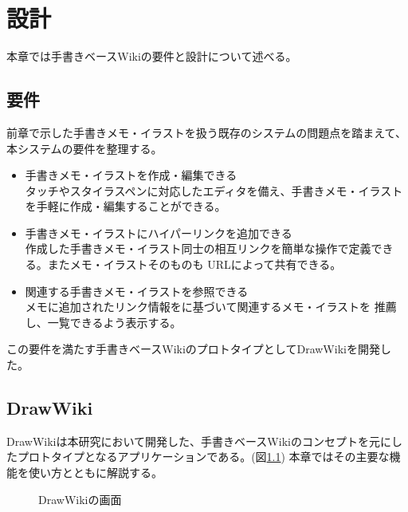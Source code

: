 \chapter{設計}
\label{chap:sekkei}

本章では手書きベースWikiの要件と設計について述べる。

\newpage

\section{要件}
前章で示した手書きメモ・イラストを扱う既存のシステムの問題点を踏まえて、本システムの要件を整理する。
\begin{itemize}
    \item 手書きメモ・イラストを作成・編集できる\\
    タッチやスタイラスペンに対応したエディタを備え、手書きメモ・イラストを手軽に作成・編集することができる。
    \item 手書きメモ・イラストにハイパーリンクを追加できる\\
    作成した手書きメモ・イラスト同士の相互リンクを簡単な操作で定義できる。またメモ・イラストそのものも
    URLによって共有できる。
    \item 関連する手書きメモ・イラストを参照できる\\
    メモに追加されたリンク情報をに基づいて関連するメモ・イラストを
    推薦し、一覧できるよう表示する。
\end{itemize}
この要件を満たす手書きベースWikiのプロトタイプとしてDrawWikiを開発した。

\section{DrawWiki}
DrawWikiは本研究において開発した、手書きベースWikiのコンセプトを元にしたプロトタイプとなるアプリケーションである。(図\ref{drawwiki})
本章ではその主要な機能を使い方とともに解説する。

\begin{figure}[htbp]
    \begin{center}
         \end{center}
    \caption{DrawWikiの画面}
    \label{drawwiki}
\end{figure}

